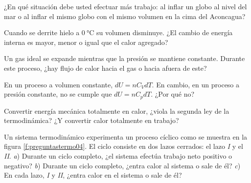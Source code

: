 %
\begin{Exercise}
  ¿En qué situación debe usted efectuar más trabajo: al inflar un globo al nivel del mar o al inflar el mismo globo con el mismo volumen en la cima del Aconcagua?
\end{Exercise}
%
\begin{Exercise}
  {}{}
  Cuando se derrite hielo a $\SI{0}{\celsius}$ su volumen disminuye. ¿El cambio de energía interna es mayor, menor o igual que el calor agregado?
\end{Exercise}
%
\begin{Exercise}
  Un gas ideal se expande mientras que la presión se mantiene constante. Durante este proceso, ¿hay flujo de calor hacia el gas o hacia afuera de este?
\end{Exercise}
%
\begin{Exercise}
  En un proceso a volumen constante, $dU = nC_VdT$. En cambio, en un proceso a presión constante, no se cumple que $dU = nC_pdT$. ¿Por qué no?
\end{Exercise}
%
\begin{Exercise}
  Convertir energía mecánica totalmente en calor, ¿viola la segunda ley de la termodinámica? ¿Y convertir calor totalmente en trabajo?
\end{Exercise}
%
\begin{Exercise}\label{p:preguntastermo04}
  Un sistema termodinámico experimenta un proceso cíclico como se muestra en la figura \ref{f:preguntastermo04}. El ciclo consiste en dos lazos cerrados: el lazo \textit{I} y el \textit{II}. \textit{a}) Durante un ciclo completo, ¿el sistema efectúa trabajo neto positivo o negativo? \textit{b}) Durante un ciclo completo, ¿entra calor al sistema o sale de él? \textit{c}) En cada lazo, \textit{I} y \textit{II}, ¿entra calor en el sistema o sale de él?
\end{Exercise}
%
\begin{center}
\end{center}
